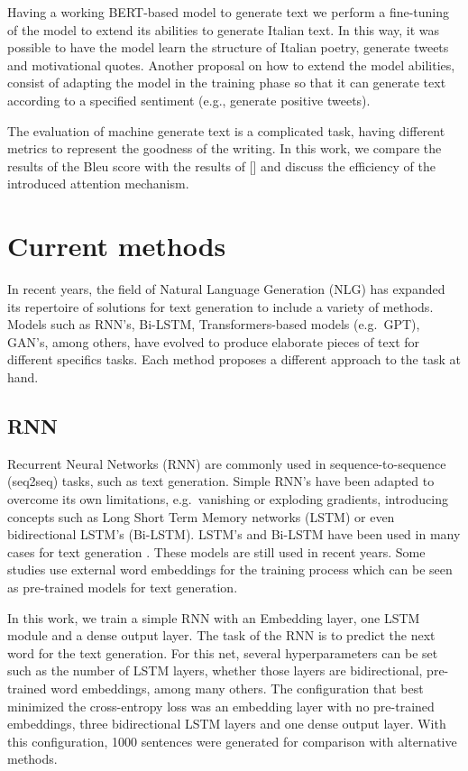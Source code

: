 \documentclass[10pt,twocolumn,letterpaper]{article}
\begin{document}
Having a working BERT-based model to generate text we perform a fine-tuning of the model
to extend its abilities to generate Italian text. In this way, it was possible to have the
model learn the structure of Italian poetry, generate tweets and motivational quotes.
Another proposal on how to extend the model abilities, consist of adapting the model in
the training phase so that it can generate text according to a specified sentiment
(e.g., generate positive tweets).

The evaluation of machine generate text is a complicated task, having different metrics
to represent the goodness of the writing. In this work, we compare the results of the Bleu
score with the results of [] and discuss the efficiency of the introduced attention
mechanism.

\section{Current methods}

In recent years, the field of Natural Language Generation (NLG) has expanded its repertoire
of solutions for text generation to include a variety of methods.
Models such as RNN's, Bi-LSTM, Transformers-based models (e.g.\ GPT), GAN's, among others, have evolved
to produce elaborate pieces of text for different specifics tasks.
Each method proposes a different approach to the task at hand.

\subsection{RNN}

Recurrent Neural Networks (RNN) are commonly used in sequence-to-sequence (seq2seq) tasks, such as text generation.
Simple RNN's have been adapted to overcome its own limitations, e.g.\ vanishing or exploding gradients,
introducing concepts such as Long Short Term Memory networks (LSTM) or even bidirectional LSTM's (Bi-LSTM).
LSTM's and Bi-LSTM have been used in many cases for text generation \cite{Bengali} \cite{lstm1} \cite{lstm2} \cite{lstm3}.
These models are still used in recent years.
Some studies \cite{embedds} use external word embeddings for the training process which can be seen as pre-trained
models for text generation.

In this work, we train a simple RNN with an Embedding layer, one LSTM module and a dense output layer.
The task of the RNN is to predict the next word for the text generation.
For this net, several hyperparameters can be set such as the number of LSTM layers, whether those layers
are bidirectional, pre-trained word embeddings, among many others.
The configuration that best minimized the cross-entropy loss was an embedding layer with no pre-trained embeddings,
three bidirectional LSTM layers and one dense output layer.
With this configuration, 1000 sentences were generated for comparison with alternative methods.
\end{document}
